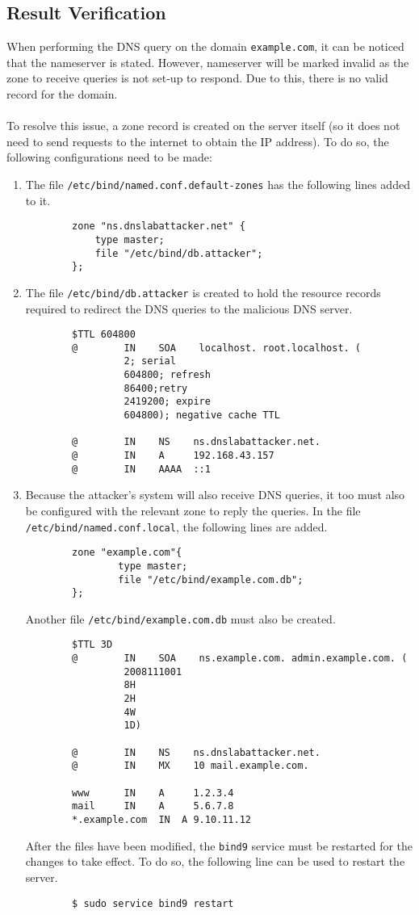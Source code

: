 \documentclass[a4paper,12pt]{article}
\begin{document}
		\subsection{Result Verification}
		When performing the DNS query on the domain \texttt{example.com}, it can be noticed that the nameserver is stated. However, nameserver will be marked invalid as the zone to receive queries is not set-up to respond. Due to this, there is no valid record for the domain.\\\\To resolve this issue, a zone record is created on the server itself (so it does not need to send requests to the internet to obtain the IP address). To do so, the following configurations need to be made:
		\begin{enumerate}
		\itemsep0em
		\item The file \texttt{/etc/bind/named.conf.default-zones} has the following lines added to it.
		\begin{verbatim}
		zone "ns.dnslabattacker.net" {
		    type master;
		    file "/etc/bind/db.attacker";
		};
		\end{verbatim}
		\item The file \texttt{/etc/bind/db.attacker} is created to hold the resource records required to redirect the DNS queries to the malicious DNS server.
		\begin{verbatim}
		$TTL 604800
		@        IN    SOA    localhost. root.localhost. (
		         2; serial
		         604800; refresh
		         86400;retry
		         2419200; expire
		         604800); negative cache TTL
		         
		@        IN    NS    ns.dnslabattacker.net.
		@        IN    A     192.168.43.157
		@        IN    AAAA  ::1
		\end{verbatim}
		\item Because the attacker's system will also receive DNS queries, it too must also be configured with the relevant zone to reply the queries. In the file \texttt{/etc/bind/named.conf.local}, the following lines are added.
		\begin{verbatim}
		zone "example.com"{
		        type master;
		        file "/etc/bind/example.com.db";
		};
		\end{verbatim}
		Another file \texttt{/etc/bind/example.com.db} must also be created.
		\begin{verbatim}
		$TTL 3D
		@        IN    SOA    ns.example.com. admin.example.com. (
		         2008111001
		         8H
		         2H
		         4W
		         1D)
		
		@        IN    NS    ns.dnslabattacker.net.
		@        IN    MX    10 mail.example.com.
		
		www      IN    A     1.2.3.4
		mail     IN    A     5.6.7.8
		*.example.com  IN  A 9.10.11.12
		\end{verbatim}
		After the files have been modified, the \texttt{bind9} service must be restarted for the changes to take effect. To do so, the following line can be used to restart the server.
		\begin{verbatim}
		$ sudo service bind9 restart
		\end{verbatim}
		\end{enumerate}
\end{document}
